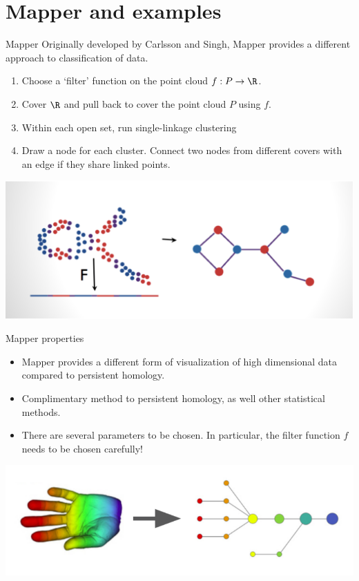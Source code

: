 \documentclass[usenames,dvipsnames,aspectratio=1610]{beamer}
\newcommand{\ra}{\rightarrow}
\begin{document}
\section{Mapper and examples}
\begin{frame}{Mapper}
  Originally developed by Carlsson and Singh, Mapper provides a different approach
  to classification of data.

  \begin{enumerate}
    \item Choose a `filter' function on the point cloud $f:P \ra \R$.
    \item Cover $\R$ and pull back to cover the point cloud $P$ using $f$.
    \item Within each open set, run single-linkage clustering
    \item Draw a node for each cluster. Connect two nodes from different covers with an edge if they share linked points.
  \end{enumerate}

  \begin{center}
    \includegraphics[scale=0.2]{mapper1.png}
  \end{center}
\end{frame}

\begin{frame}{Mapper properties}
 \begin{itemize}
   \item Mapper provides a different form of visualization of high dimensional
     data compared to persistent homology.
   \item Complimentary method to persistent homology, as well other 
     statistical methods.
   \item There are several parameters to be chosen. In particular, 
     the {\color{red} filter function $f$} needs to be chosen carefully!
 \end{itemize}

 \begin{center}
   \includegraphics[scale=0.5]{mapper_hand.png}
 \end{center}
 \end{frame}
\end{document}
